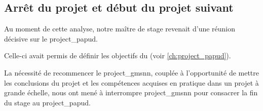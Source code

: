 \subsection{Arrêt du projet et début du projet suivant}
Au moment de cette analyse, notre maître de stage revenait d'une réunion décisive sur le \gls{project_papud}. %

Celle-ci avait permis de définir les objectifs du  (voir \autoref{ch:project_papud}).

La nécessité de recommencer le \gls{project_gmsnn}, couplée à l'opportunité de mettre les conclusions du projet et les compétences acquises en pratique dans un projet à grande échelle, nous ont mené à interrompre \gls{project_gmsnn} pour consacrer la fin du stage au \gls{project_papud}.